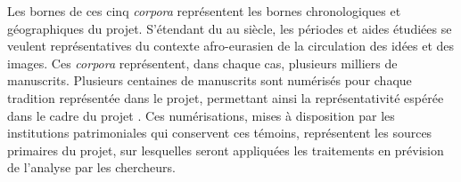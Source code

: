 Les bornes de ces cinq \textit{corpora} représentent les bornes chronologiques et géographiques du projet. S'étendant du \viii au \xviii siècle, les périodes et aides étudiées se veulent représentatives du contexte afro-eurasien de la circulation des idées et des images. Ces \textit{corpora} représentent, dans chaque cas, plusieurs milliers de manuscrits. Plusieurs centaines de manuscrits sont numérisés pour chaque tradition représentée dans le projet, permettant ainsi la représentativité espérée dans le cadre du projet \eida. Ces numérisations, mises à disposition par les institutions patrimoniales qui conservent ces témoins, représentent les sources primaires du projet, sur lesquelles seront appliquées les traitements en prévision de l'analyse par les chercheurs.
